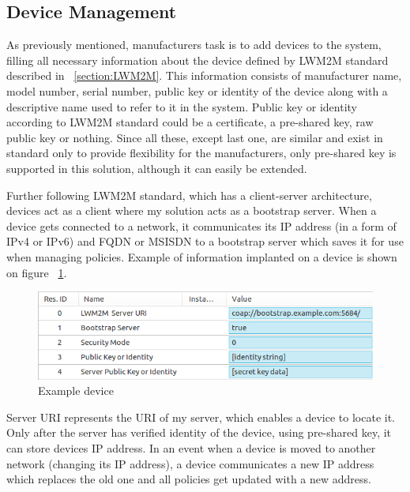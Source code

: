 \subsection{Device Management}
\label{deviceManagement}

As previously mentioned, manufacturers task is to add devices to the system, filling all necessary information about the device defined by LWM2M standard described in ~\ref{section:LWM2M}. This information consists of manufacturer name, model number, serial number, public key or identity of the device along with a descriptive name used to refer to it in the system. Public key or identity according to LWM2M standard could be a certificate, a pre-shared key, raw public key or nothing. Since all these, except last one, are similar and exist in standard only to provide flexibility for the manufacturers, only pre-shared key is supported in this solution, although it can easily be extended. 

Further following LWM2M standard, which has a client-server architecture, devices act as a client where my solution acts as a bootstrap server. When a device gets connected to a network, it communicates its IP address (in a form of IPv4 or IPv6) and FQDN or MSISDN to a bootstrap server which saves it for use when managing policies. Example of information implanted on a device is shown on figure ~\ref{fig:device}.

\begin{figure}[ht]
	\begin{center}
		\includegraphics[width=\textwidth]{images/Device}
		\caption{Example device}
		\label{fig:device}
	\end{center}
\end{figure}

Server URI represents the URI of my server, which enables a device to locate it. Only after the server has verified identity of the device, using pre-shared key, it can store devices IP address. In an event when a device is moved to another network (changing its IP address), a device communicates a new IP address which replaces the old one and all policies get updated with a new address.

